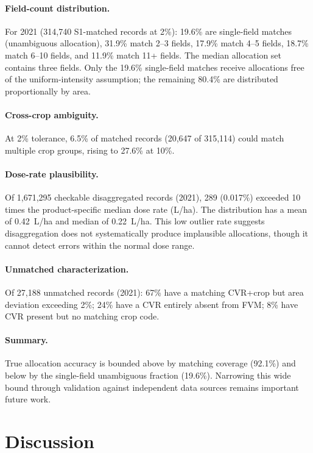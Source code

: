 \documentclass[12pt,a4paper]{article}
\begin{document}
\paragraph{Field-count distribution.} For 2021 (314,740 S1-matched records at 2\%): 19.6\% are single-field matches (unambiguous allocation), 31.9\% match 2--3 fields, 17.9\% match 4--5 fields, 18.7\% match 6--10 fields, and 11.9\% match 11+ fields. The median allocation set contains three fields. Only the 19.6\% single-field matches receive allocations free of the uniform-intensity assumption; the remaining 80.4\% are distributed proportionally by area.

\paragraph{Cross-crop ambiguity.} At 2\% tolerance, 6.5\% of matched records (20,647 of 315,114) could match multiple crop groups, rising to 27.6\% at 10\%.

\paragraph{Dose-rate plausibility.} Of 1,671,295 checkable disaggregated records (2021), 289 (0.017\%) exceeded 10 times the product-specific median dose rate (L/ha). The distribution has a mean of 0.42~L/ha and median of 0.22~L/ha. This low outlier rate suggests disaggregation does not systematically produce implausible allocations, though it cannot detect errors within the normal dose range.

\paragraph{Unmatched characterization.} Of 27,188 unmatched records (2021): 67\% have a matching CVR+crop but area deviation exceeding 2\%; 24\% have a CVR entirely absent from FVM; 8\% have CVR present but no matching crop code.

\paragraph{Summary.} True allocation accuracy is bounded above by matching coverage (92.1\%) and below by the single-field unambiguous fraction (19.6\%). Narrowing this wide bound through validation against independent data sources remains important future work.

\section{Discussion}
\end{document}
